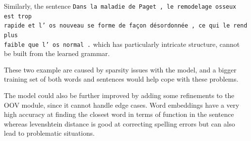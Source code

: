 \documentclass[11pt]{article}
\begin{document}
    Similarly, the sentence \texttt{Dans la maladie de Paget , le remodelage 
    osseux est trop \\rapide et l' os nouveau se forme de façon désordonnée , 
    ce qui le rend plus \\faible que l' os normal .} which has particularly 
    intricate structure, cannot be built from the learned grammar. 

    These two example are caused by sparsity issues with the model, and a 
    bigger training set of both words and sentences would help cope with these 
    problems.

    The model could also be further improved by adding some refinements to the 
    OOV module, since it cannot handle edge cases. Word embeddings have a very
    high accuracy at finding the closest word in terms of function in the 
    sentence whereas levenshtein distance is good at correcting spelling errors
    but can also lead to problematic situations. 
\end{document}
